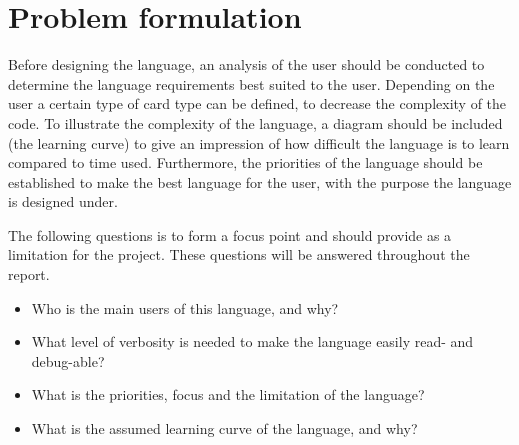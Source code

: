 \section{Problem formulation}
Before designing the language, an analysis of the user should be conducted to determine the language requirements best suited to the user. Depending on the user a certain type of card type can be defined, to decrease the complexity of the code. To illustrate the complexity of the language, a diagram should be included (the learning curve) to give an impression of how difficult the language is to learn compared to time used. Furthermore, the priorities of the language should be established to make the best language for the user, with the purpose the language is designed under.

The following questions is to form a focus point and should provide as a limitation for the project. These questions will be answered throughout the report. 

\begin{itemize}
	\item Who is the main users of this language, and why?
	\item What level of verbosity is needed to make the language easily read- and debug-able?
	\item What is the priorities, focus and the limitation of the language?
	\item What is the assumed learning curve of the language, and why?
\end{itemize}